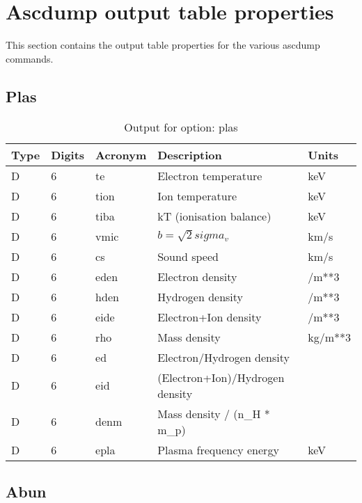 \section{Ascdump output table properties}

This section contains the output table properties for the various ascdump commands.

\subsection{Plas}

\begin{table}[!p]
\caption{Output for option: plas}
\label{tabout:plas}
\begin{tabular}{lllll}
\hline
Type & Digits & Acronym & Description & Units \\ 
\hline
D &  6 & te   & Electron temperature             & keV              \\
D &  6 & tion & Ion temperature                  & keV              \\
D &  6 & tiba & kT (ionisation balance)          & keV              \\
D &  6 & vmic & $b = \sqrt{2} sigma_v$           & km/s             \\
D &  6 & cs   & Sound speed                      & km/s             \\
D &  6 & eden & Electron density                 & /m**3            \\
D &  6 & hden & Hydrogen density                 & /m**3            \\
D &  6 & eide & Electron+Ion density             & /m**3            \\
D &  6 & rho  & Mass density                     & kg/m**3          \\
D &  6 & ed   & Electron/Hydrogen density        &                  \\
D &  6 & eid  & (Electron+Ion)/Hydrogen density  &                  \\
D &  6 & denm & Mass density / (n_H * m_p)       &                  \\
D &  6 & epla & Plasma frequency energy          & keV              \\
\hline
\end{tabular}
\end{table}

\subsection{Abun}

